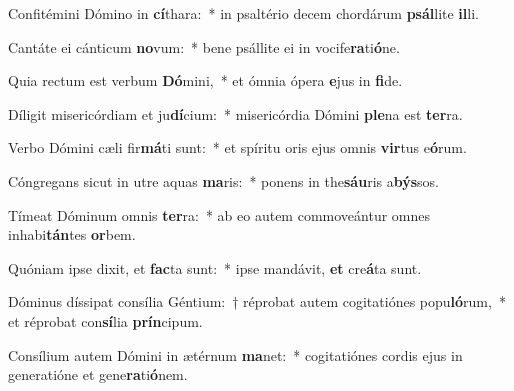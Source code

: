\item Confitémini Dómino in \textbf{cí}thara:~* in psaltério decem chordárum \textbf{psál}lite \textbf{il}li.
\item Cantáte ei cánticum \textbf{no}vum:~* bene psállite ei in vocife\textbf{ra}ti\textbf{ó}ne.
\item Quia rectum est verbum \textbf{Dó}mini,~* et ómnia ópera \textbf{e}jus in \textbf{fi}de.
\item Díligit misericórdiam et ju\textbf{dí}cium:~* misericórdia Dómini \textbf{ple}na est \textbf{ter}ra.
\item Verbo Dómini cæli fir\textbf{má}ti sunt:~* et spíritu oris ejus omnis \textbf{vir}tus e\textbf{ó}rum.
\item Cóngregans sicut in utre aquas \textbf{ma}ris:~* ponens in the\textbf{sáu}ris a\textbf{býs}sos.
\item Tímeat Dóminum omnis \textbf{ter}ra:~* ab eo autem commoveántur omnes inhabi\textbf{tán}tes \textbf{or}bem.
\item Quóniam ipse dixit, et \textbf{fac}ta sunt:~* ipse mandávit, \textbf{et} cre\textbf{á}ta sunt.
\item Dóminus díssipat consília Géntium:~† réprobat autem cogitatiónes popu\textbf{ló}rum,~* et réprobat con\textbf{sí}lia \textbf{prín}cipum.
\item Consílium autem Dómini in ætérnum \textbf{ma}net:~* cogitatiónes cordis ejus in generatióne et gene\textbf{ra}ti\textbf{ó}nem.
